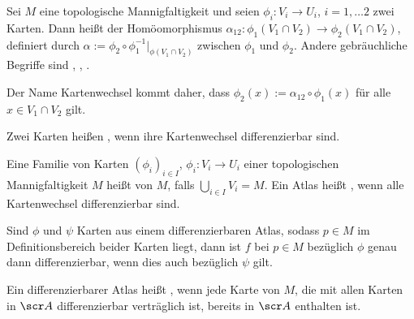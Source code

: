 \begin{df} \label{1.6}
    Sei $M$ eine topologische Mannigfaltigkeit und seien $\phi_i: V_i \to U_i$, $i = 1, \dotsc 2$ zwei Karten.
    Dann heißt der Homöomorphismus $\alpha_{12}: \phi_1(V_1 \cap V_2) \to \phi_2(V_1 \cap V_2)$, definiert durch
    \begin{math}
        \alpha := \phi_2 \circ \phi_1^{-1}|_{\phi(V_1 \cap V_2)}
    \end{math}
     zwischen $\phi_1$ und $\phi_2$.
    Andere gebräuchliche Begriffe sind , , .
    \begin{note}
        Der Name Kartenwechsel kommt daher, dass $\phi_2(x) := \alpha_{12} \circ \phi_1(x)$ für alle $x \in V_1 \cap V_2$ gilt.
    \end{note}
    Zwei Karten heißen , wenn ihre Kartenwechsel differenzierbar sind.

    Eine Familie von Karten $(\phi_i)_{i\in I}$, $\phi_i: V_i \to U_i$ einer topologischen Mannigfaltigkeit $M$ heißt  von $M$, falls $\bigcup_{i \in I} V_i = M$.
    Ein Atlas heißt , wenn alle Kartenwechsel differenzierbar sind.
    \begin{note}
        Sind $\phi$ und $\psi$ Karten aus einem differenzierbaren Atlas, sodass $p \in M$ im Definitionsbereich beider Karten liegt, dann ist $f$ bei $p \in M$ bezüglich $\phi$ genau dann differenzierbar, wenn dies auch bezüglich $\psi$ gilt.
    \end{note}
    Ein differenzierbarer Atlas heißt , wenn jede Karte von $M$, die mit allen Karten in $\scr A$ differenzierbar verträglich ist, bereits in $\scr A$ enthalten ist.
\end{df}

